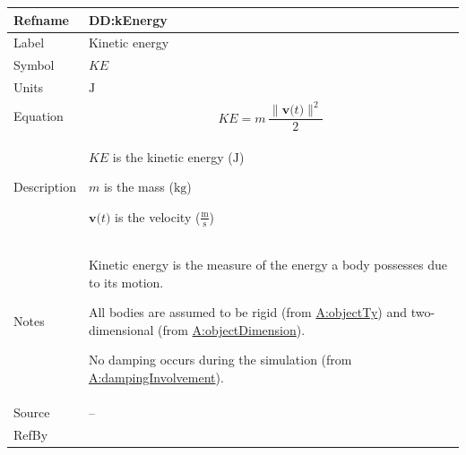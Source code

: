 \documentclass[12pt]{article}
\begin{document}
\medskip
\noindent
\begin{minipage}{\textwidth}
\begin{tabular}{>{\raggedright}p{}>{\raggedright\arraybackslash}p{}}
\toprule \textbf{Refname} & \textbf{DD:kEnergy}
\label{DD:kEnergy}
\\ \midrule
Label & Kinetic energy
        
\\ \midrule
Symbol & $KE$
         
\\ \midrule
Units & ${\text{J}}$
        
\\ \midrule
Equation & \begin{displaymath}
           KE=m\,\frac{\|\symbf{v}\text{(}t\text{)}\|^{2}}{2}
           \end{displaymath}
\\ \midrule
Description & \begin{symbDescription}
              \item{$KE$ is the kinetic energy (${\text{J}}$)}
              \item{$m$ is the mass (${\text{kg}}$)}
              \item{$\symbf{v}\text{(}t\text{)}$ is the velocity ($\frac{\text{m}}{\text{s}}$)}
              \end{symbDescription}
\\ \midrule
Notes & Kinetic energy is the measure of the energy a body possesses due to its motion.
        
        All bodies are assumed to be rigid (from \hyperref[assumpOT]{A:objectTy}) and two-dimensional (from \hyperref[assumpOD]{A:objectDimension}).
        
        No damping occurs during the simulation (from \hyperref[assumpDI]{A:dampingInvolvement}).
        
\\ \midrule
Source & --
         
\\ \midrule
RefBy & 
\\ \bottomrule
\end{tabular}
\end{minipage}
\end{document}
